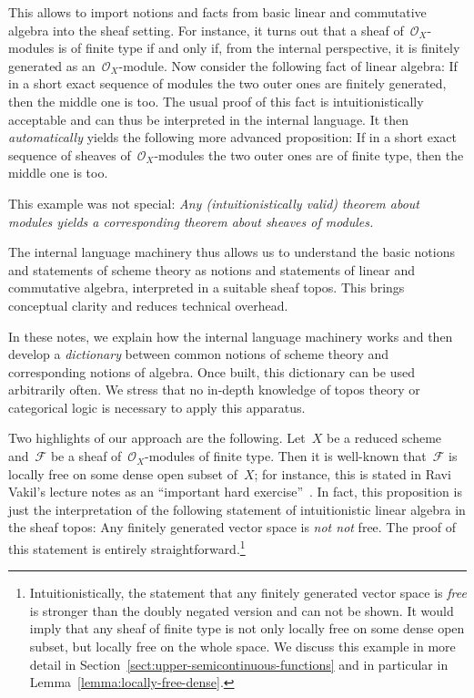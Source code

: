 \documentclass[10pt]{amsart}
\theoremstyle{definition}
\theoremstyle{plain}
\theoremstyle{remark}
\newcommand{\F}{\mathcal{F}}
\renewcommand{\O}{\mathcal{O}}
\newcommand{\?}{\,{:}\,}
\renewcommand{\_}{\mathpunct{.}\,}
\begin{document}
This allows to import notions and facts from basic linear and commutative
algebra into the sheaf setting. For instance, it turns out that a sheaf
of~$\O_X$-modules is of finite type if and only if, from the internal
perspective, it is finitely generated as an~$\O_X$-module. Now consider the
following fact of linear algebra: If in a short exact sequence of modules the two
outer ones are finitely generated, then the middle one is too. The usual proof of
this fact is intuitionistically acceptable and can thus be interpreted in the
internal language. It then \emph{automatically} yields the following more advanced
proposition: If in a short exact sequence of sheaves of~$\O_X$-modules the
two outer ones are of finite type, then the middle one is too.

This example was not special: \emph{Any (intuitionistically valid) theorem
about modules yields a corresponding theorem about sheaves of modules.}

The internal language machinery thus allows us to understand the basic notions
and statements of scheme theory as notions and statements of linear and
commutative algebra, interpreted in a suitable sheaf topos. This brings
conceptual clarity and reduces technical overhead.

In these notes, we explain how the internal language machinery works and then develop a
\emph{dictionary} between common notions of scheme theory and corresponding
notions of algebra. Once built, this dictionary can be used arbitrarily often.
We stress that no in-depth knowledge of topos theory or categorical logic is
necessary to apply this apparatus.

Two highlights of our approach are the following. Let~$X$ be a reduced scheme
and~$\F$ be a sheaf of~$\O_X$-modules of finite type. Then it is well-known
that~$\F$ is locally free on some dense open subset of~$X$; for instance, this
is stated in Ravi Vakil's lecture notes as an ``important hard
exercise''~\cite[Exercise~13.7.K]{vakil:foag}. In fact, this proposition is just the
interpretation of the following statement of intuitionistic linear algebra in
the sheaf topos: Any finitely generated vector space is \emph{not not} free.
The proof of this statement is entirely straightforward.\footnote{Intuitionistically,
the statement that any finitely generated vector space is \emph{free} is stronger than
the doubly negated version and can not be shown. It would imply that any sheaf
of finite type is not only locally free on some dense open subset, but locally
free on the whole space. We discuss this example in more detail in
Section~\ref{sect:upper-semicontinuous-functions} and in particular in
Lemma~\ref{lemma:locally-free-dense}.}
\end{document}
